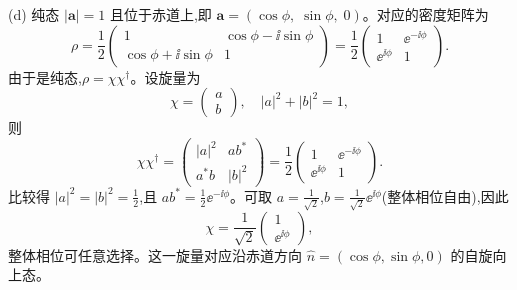 \begin{solution}
(d) 纯态 $|\mathbf a|=1$ 且位于赤道上,即 $\mathbf a = (\cos\phi,\;\sin\phi,\;0)$。对应的密度矩阵为
\[
\rho = \frac12\begin{pmatrix}
1 & \cos\phi - \ii\sin\phi\\
\cos\phi + \ii\sin\phi & 1
\end{pmatrix}
= \frac12\begin{pmatrix}
1 & \ee^{-\ii\phi}\\
\ee^{\ii\phi} & 1
\end{pmatrix}.
\]
由于是纯态,$\rho = \chi\chi^\dagger$。设旋量为
\[
\chi = \begin{pmatrix}a\\b\end{pmatrix},\quad |a|^2+|b|^2=1,
\]
则
\[
\chi\chi^\dagger = \begin{pmatrix}|a|^2 & ab^*\\ a^*b & |b|^2\end{pmatrix}
= \frac12\begin{pmatrix}1 & \ee^{-\ii\phi}\\ \ee^{\ii\phi} & 1\end{pmatrix}.
\]
比较得 $|a|^2 = |b|^2 = \frac12$,且 $ab^* = \frac12 \ee^{-\ii\phi}$。可取 $a = \frac{1}{\sqrt{2}}$,$b = \frac{1}{\sqrt{2}}\ee^{\ii\phi}$(整体相位自由),因此
\[
\boxed{\chi = \frac{1}{\sqrt{2}}\begin{pmatrix}1\\ \ee^{\ii\phi}\end{pmatrix},}
\]
整体相位可任意选择。这一旋量对应沿赤道方向 $\hat n = (\cos\phi,\sin\phi,0)$ 的自旋向上态。
\end{solution}
